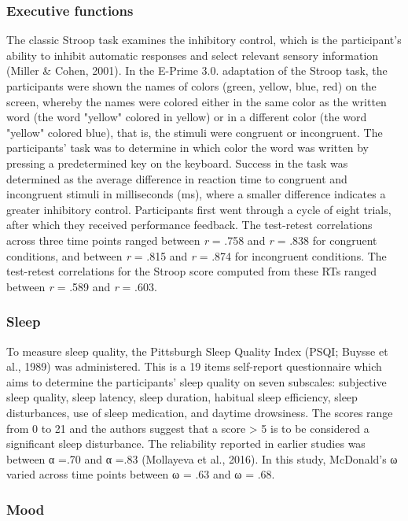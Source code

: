 \documentclass[authordate, empirical]{jote-new-article}
\begin{document}
\subsubsection{Executive functions}
The classic Stroop task examines the inhibitory control, which is the participant's ability to inhibit automatic responses and select relevant sensory information (Miller \& Cohen, 2001). In the E-Prime 3.0. adaptation of the Stroop task, the participants were shown the names of colors (green, yellow, blue, red) on the screen, whereby the names were colored either in the same color as the written word (the word "yellow" colored in yellow) or in a different color (the word "yellow" colored blue), that is, the stimuli were congruent or incongruent. The participants' task was to determine in which color the word was written by pressing a predetermined key on the keyboard. Success in the task was determined as the average difference in reaction time to congruent and incongruent stimuli in milliseconds (ms), where a smaller difference indicates a greater inhibitory control. Participants first went through a cycle of eight trials, after which they received performance feedback. The test-retest correlations across three time points ranged between \emph{r} = .758 and \emph{r} = .838 for congruent conditions, and between \emph{r} = .815 and \emph{r} = .874 for incongruent conditions. The test-retest correlations for the Stroop score computed from these RTs ranged between \emph{r} = .589 and \emph{r} = .603.



\subsubsection{Sleep}

To measure sleep quality, the Pittsburgh Sleep Quality Index (PSQI; Buysse et al., 1989) was administered. This is a 19 items self-report questionnaire which aims to determine the participants' sleep quality on seven subscales: subjective sleep quality, sleep latency, sleep duration, habitual sleep efficiency, sleep disturbances, use of sleep medication, and daytime drowsiness. The scores range from 0 to 21 and the authors suggest that a score > 5 is to be considered a significant sleep disturbance. The reliability reported in earlier studies was between α =.70 and α =.83 (Mollayeva et al., 2016). In this study, McDonald's ω varied across time points between ω = .63 and ω = .68.


\subsubsection{Mood}
\end{document}
